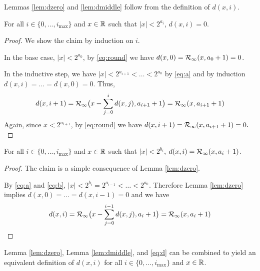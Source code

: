     Lemmas \ref{lem:dzero} and \ref{lem:dmiddle} follow from the definition of $d(x, i)$.

    \begin{samepage}
    \begin{lem}
      For all $i \in \{0, ..., i_{\max}\}$ and $x \in \mathbb{R}$ such that $|x| < 2^{a_i}$,
      $d(x, i) = 0.$
      \label{lem:dzero}
    \end{lem}
    \end{samepage}

    \begin{proof}
      We show the claim by induction on $i$.

      In the base case, $|x| < 2^{a_0}$, by \eqref{eq:round} we have
      $d(x, 0) = \mathcal{R}_\text{$\infty$}(x, a_0 + 1) = 0$.

      In the inductive step, we have $|x| < 2^{a_{i + 1}} < \ldots < 2^{a_0}$ by \eqref{eq:a}
      and by induction $d(x, i)= ... = d(x, 0) = 0$. Thus,
      \[
        d(x, i + 1) = \mathcal{R}_\text{$\infty$}\bigl(x - \sum\limits_{j = 0}^{i}d(x, j), a_{i + 1} + 1\bigr)
            = \mathcal{R}_\text{$\infty$}(x, a_{i+1} + 1)
      \]
      Again, since $x < 2^{a_{i+1}}$, by \eqref{eq:round} we have
      \(
        d(x, i + 1) = \mathcal{R}_\text{$\infty$}(x, a_{i + 1} + 1) = 0.
      \)
    \end{proof}

    \begin{samepage}
    \begin{lem}
      For all $i \in \{0, ..., i_{\max}\}$ and $x \in \mathbb{R}$ such that $|x| < 2^{b_i}$,
      $d(x, i) = \mathcal{R}_\text{$\infty$}(x, a_i + 1)$.
      \label{lem:dmiddle}
    \end{lem}
    \end{samepage}

    \begin{proof}
      The claim is a simple consequence of Lemma \ref{lem:dzero}.

      By  \eqref{eq:a} and \eqref{eq:b}, $|x| < 2^{b_i} = 2^{a_{i - 1}} < \ldots <2^{a_0}$.
      Therefore Lemma \ref{lem:dzero} implies $d(x, 0) = ... = d(x, i - 1) = 0$
      and we have
      \[
        d(x, i) = \mathcal{R}_\text{$\infty$}\bigl(x - \sum\limits_{j = 0}^{i - 1}d(x, j), a_{i} + 1\bigr)
            = \mathcal{R}_\text{$\infty$}(x, a_{i} + 1)
      \]
    \end{proof}

    Lemma \ref{lem:dzero}, Lemma \ref{lem:dmiddle}, and \eqref{eq:d} can be
    combined to yield an equivalent definition of $d(x, i)$ for all $i \in \{0,
    ..., i_{\max}\}$ and $x \in \mathbb{R}$.

